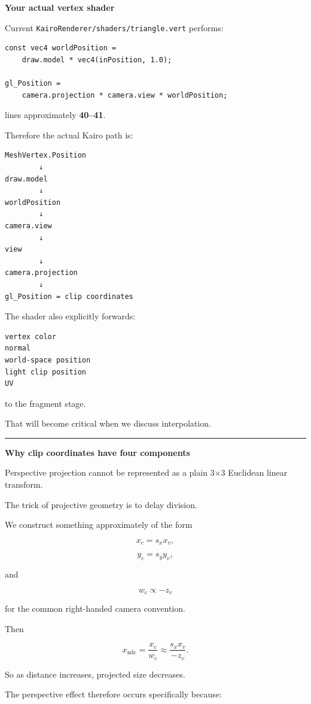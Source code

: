 \textbf{Your actual vertex shader}

Current \texttt{KairoRenderer/shaders/triangle.vert} performs:

\begin{verbatim}
const vec4 worldPosition =
    draw.model * vec4(inPosition, 1.0);

gl_Position =
    camera.projection * camera.view * worldPosition;
\end{verbatim}

lines approximately \textbf{40--41}.

Therefore the actual Kairo path is:

\begin{verbatim}
MeshVertex.Position
        ↓
draw.model
        ↓
worldPosition
        ↓
camera.view
        ↓
view
        ↓
camera.projection
        ↓
gl_Position = clip coordinates
\end{verbatim}

The shader also explicitly forwards:

\begin{verbatim}
vertex color
normal
world-space position
light clip position
UV
\end{verbatim}

to the fragment stage.

That will become critical when we discuss interpolation.

\begin{center}\rule{0.5\linewidth}{0.5pt}\end{center}

\textbf{Why clip coordinates have four components}

Perspective projection cannot be represented as a plain 3×3 Euclidean linear transform.

The trick of projective geometry is to delay division.

We construct something approximately of the form

\[
x_c = s_xx_v,
\]

\[
y_c = s_yy_v,
\]

and

\[
w_c \propto -z_v
\]

for the common right-handed camera convention.

Then

\[
x_{\text{ndc}}
=
\frac{x_c}{w_c}
\approx
\frac{s_xx_v}{-z_v}.
\]

So as distance increases, projected size decreases.

The perspective effect therefore occurs specifically because:

